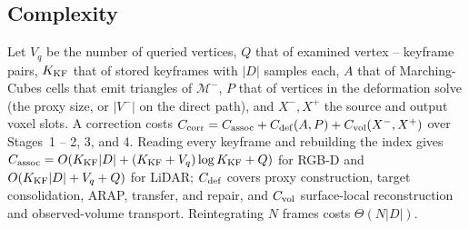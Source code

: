 \subsection{Complexity}
\label{sec:complexity}

Let $V_q$ be the number of queried vertices, $Q$ that of examined
vertex -- keyframe pairs, $K_{\rm KF}$ that of stored keyframes with $|D|$
samples each, $A$ that of Marching-Cubes cells that emit triangles of
$\mathcal M^-$, $P$ that of vertices in the deformation solve (the proxy size,
or $|V^-|$ on the direct path), and $X^-,X^+$ the source and output voxel
slots. A correction costs
$C_{\rm corr}=C_{\rm assoc}+C_{\rm def}(A,P)+C_{\rm vol}(X^-,X^+)$ over
Stages~1 -- 2, 3, and 4. Reading every keyframe and rebuilding the index gives
$C_{\rm assoc}=O(K_{\rm KF}|D|+(K_{\rm KF}+V_q)\log K_{\rm KF}+Q)$ for RGB-D
and $O(K_{\rm KF}|D|+V_q+Q)$ for LiDAR; $C_{\rm def}$ covers proxy
construction, target consolidation, ARAP, transfer, and repair, and
$C_{\rm vol}$ surface-local reconstruction and observed-volume transport. Reintegrating $N$ frames costs $\Theta(N|D|)$.
